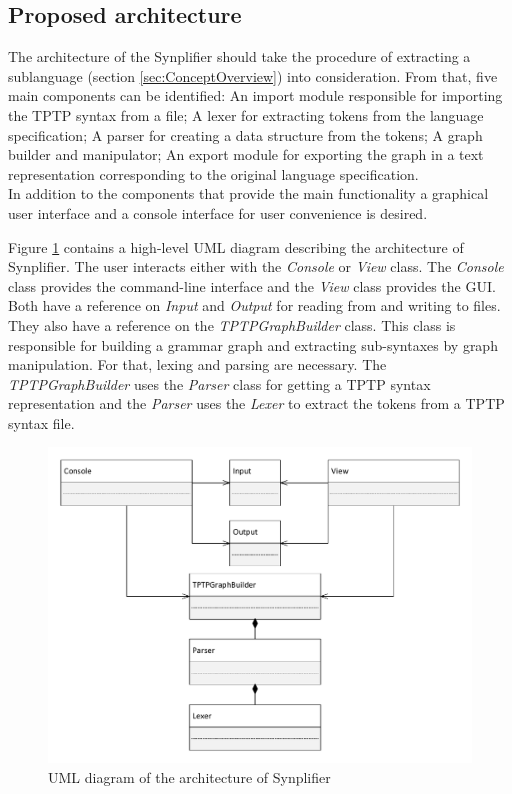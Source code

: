 \subsection{Proposed architecture}\label{sec:ConceptProposedArchitecture}
The architecture of the \ac{Synplifier} should take the procedure of extracting a sublanguage (section \ref{sec:ConceptOverview}) into consideration.
From that, five main components can be identified:
An import module responsible for importing the \ac{TPTP} syntax from a file;
A lexer for extracting tokens from the language specification; A parser for creating a data structure from the tokens;
A graph builder and manipulator;
An export module for exporting the graph in a text representation corresponding to the original language specification.\\
In addition to the components that provide the main functionality a graphical user interface and a console interface for user convenience is desired.

Figure \ref{fig:ConceptArchitectureOverview} contains a high-level UML diagram describing the architecture of \ac{Synplifier}. The user interacts either with the \textit{Console} or \textit{View} class. The \textit{Console} class provides the command-line interface and the \textit{View} class provides the GUI. Both have a reference on \textit{Input} and \textit{Output} for reading from and writing to files. They also have a reference on the \textit{TPTPGraphBuilder} class. This class is responsible for building a grammar graph and extracting sub-syntaxes by graph manipulation. For that, lexing and parsing are necessary. The \textit{TPTPGraphBuilder} uses the \textit{Parser} class for getting a \ac{TPTP} syntax representation and the \textit{Parser} uses the \textit{Lexer} to extract the tokens from a \ac{TPTP} syntax file.
\begin{figure}[H]
\centering
\includegraphics[width=1\textwidth]{images/Concept_UML_Architecture_Overview.pdf}
\caption{UML diagram of the architecture of \ac{Synplifier}}
\label{fig:ConceptArchitectureOverview}
\end{figure}
